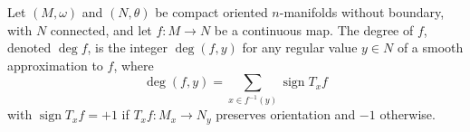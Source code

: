 Let $(M, \omega)$ and $(N, \theta)$ be compact oriented $n$-manifolds without boundary, with $N$ connected, and let $f: M \to N$ be a continuous map. The degree of $f$, denoted $\deg f$, is the integer $\deg(f, y)$ for any regular value $y \in N$ of a smooth approximation to $f$, where
$$\deg(f, y) = \sum_{x \in f^{-1}(y)} \operatorname{sign} T_x f$$
with $\operatorname{sign} T_x f = +1$ if $T_x f: M_x \to N_y$ preserves orientation and $-1$ otherwise.
